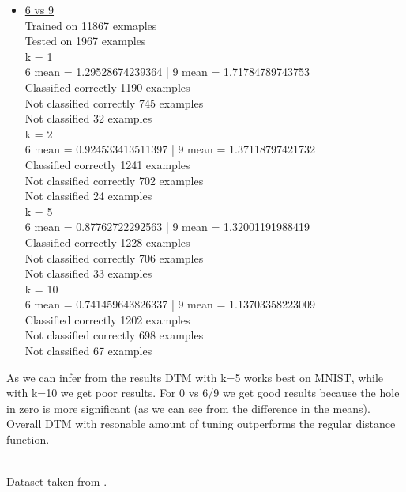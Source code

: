 \documentclass[11pt]{article}
\theoremstyle{definition}
\theoremstyle{definition}
\begin{document}
\begin{itemize}
	\item
		\underline{6 vs 9}\\
Trained on 11867 exmaples\\
Tested on  1967 examples\\
k = 1\\
6 mean = 1.29528674239364 | 9 mean = 1.71784789743753\\
Classified correctly 1190 examples\\
Not classified correctly 745 examples\\
Not classified 32 examples\\
k = 2\\
6 mean = 0.924533413511397 | 9 mean = 1.37118797421732\\
Classified correctly 1241 examples\\
Not classified correctly 702 examples\\
Not classified 24 examples\\
k = 5\\
6 mean = 0.87762722292563 | 9 mean = 1.32001191988419\\
Classified correctly 1228 examples\\
Not classified correctly 706 examples\\
Not classified 33 examples\\
k = 10\\
6 mean = 0.741459643826337 | 9 mean = 1.13703358223009\\
Classified correctly 1202 examples\\
Not classified correctly 698 examples\\
Not classified 67 examples
\end{itemize}

As we can infer from the results DTM with k=5 works best on MNIST, while with k=10 we get poor results.
For 0 vs 6/9 we get good results because the hole in zero is more significant (as we can see from the difference in the means).\\
Overall DTM with resonable amount of tuning outperforms the regular distance function.

\text{}\\
Dataset taken from \cite{mnist}.
\end{document}

